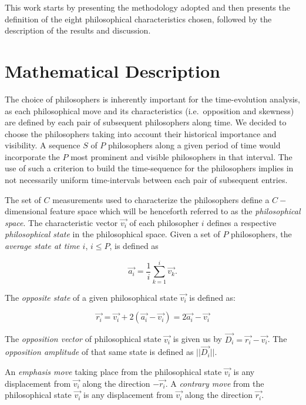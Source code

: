 \documentclass[%
 aip,
 jmp,%
 amsmath,amssymb,
 reprint,%
]{revtex4-1}
\begin{document}
This work starts by presenting the methodology adopted and then
presents the definition of the eight philosophical characteristics
chosen, followed by the description of the results and discussion.


\section{Mathematical Description}

The choice of philosophers is inherently important for the
time-evolution analysis, as each philosophical move and its
characteristics (i.e.\ opposition and skewness) are defined by each
pair of subsequent philosophers along time.  We decided to choose the
philosophers taking into account their historical importance and
visibility.  A sequence $S$ of $P$ philosophers along a given period
of time would incorporate the $P$ most prominent and visible
philosophers in that interval.  The use of such a criterion to build
the time-sequence for the philosophers implies in not necessarily
uniform time-intervals between each pair of subsequent entries.

The set of $C$ measurements used to characterize the philosophers
define a $C-$dimensional feature space which will be henceforth
referred to as the \emph{philosophical space}.  The characteristic
vector $\vec{v_i}$ of each philosopher $i$ defines a respective
\emph{philosophical state} in the philosophical space.  Given a set of
$P$ philosophers, the \emph{average state at time $i$}, $i \leq P$, is
defined as

\begin{equation}
  \vec{a_i} = \frac{1}{i}\sum_{k=1}^i\vec{v_k}.
\end{equation}

The \emph{opposite state} of a given philosophical state $\vec{v_i}$
is defined as:

\begin{equation}
  \vec{r_i} = \vec{v_i} + 2(\vec{a_i} - \vec{v_i})  = 2 \vec{a_i} - \vec{v_i}
\end{equation}

The \emph{opposition vector} of philosophical state $\vec{v_i}$ is
given us by $\vec{D_i}=\vec{r_i} - \vec{v_i}$.  The \emph{opposition
amplitude} of that same state is defined as $|| \vec{D_i} ||$.

An \emph{emphasis move} taking place from the philosophical state
$\vec{v_i}$ is any displacement from $\vec{v_i}$ along the direction
$-\vec{r_i}$.  A \emph{contrary move} from the philosophical state
$\vec{v_i}$ is any displacement from $\vec{v_i}$ along the direction
$\vec{r_i}$.
\end{document}
